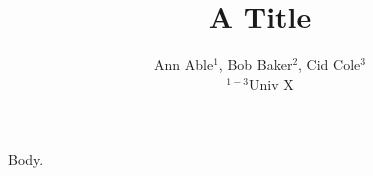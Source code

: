 \documentclass{article}
\begin{document}
\title{A Title}
\author{Ann Able$^{1}$, Bob Baker$^{2}$, Cid Cole$^{3}$\\ $^{1-3}$Univ X}
\maketitle
Body.
\end{document}
